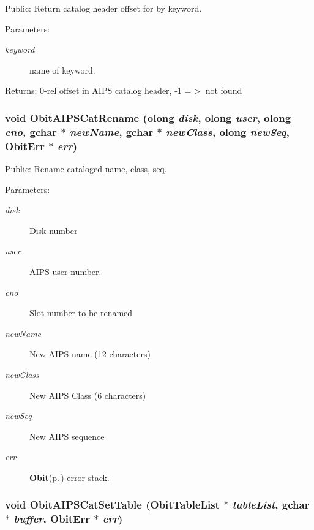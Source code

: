 Public: Return catalog header offset for by keyword. 

\begin{Desc}
\item[Parameters:]
\begin{description}
\item[{\em keyword}]name of keyword. \end{description}
\end{Desc}
\begin{Desc}
\item[Returns:]0-rel offset in AIPS catalog header, -1 =$>$ not found \end{Desc}
\subsubsection{\setlength{\rightskip}{0pt plus 5cm}void Obit\-AIPSCat\-Rename ({\bf olong} {\em disk}, {\bf olong} {\em user}, {\bf olong} {\em cno}, gchar $\ast$ {\em new\-Name}, gchar $\ast$ {\em new\-Class}, {\bf olong} {\em new\-Seq}, {\bf Obit\-Err} $\ast$ {\em err})}\label{ObitAIPSCat_8h_a11}


Public: Rename cataloged name, class, seq. 

\begin{Desc}
\item[Parameters:]
\begin{description}
\item[{\em disk}]Disk number \item[{\em user}]AIPS user number. \item[{\em cno}]Slot number to be renamed \item[{\em new\-Name}]New AIPS name (12 characters) \item[{\em new\-Class}]New AIPS Class (6 characters) \item[{\em new\-Seq}]New AIPS sequence \item[{\em err}]{\bf Obit}{\rm (p.\,\pageref{structObit})} error stack. \end{description}
\end{Desc}
\subsubsection{\setlength{\rightskip}{0pt plus 5cm}void Obit\-AIPSCat\-Set\-Table ({\bf Obit\-Table\-List} $\ast$ {\em table\-List}, gchar $\ast$ {\em buffer}, {\bf Obit\-Err} $\ast$ {\em err})}\label{ObitAIPSCat_8h_a5}



